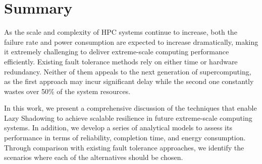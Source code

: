 \section{Summary}

As the scale and complexity of HPC systems continue to increase, both the failure rate and power consumption are expected to increase dramatically, making it extremely challenging to deliver extreme-scale computing performance efficiently. Existing fault tolerance methods rely on either time or hardware redundancy. Neither of them appeals to the next generation of supercomputing, as the first approach may incur significant delay while the second one constantly wastes over 50\% of the system resources.

In this work, we present a comprehensive discussion of the techniques that enable Lazy Shadowing to achieve scalable resilience in future extreme-scale computing systems. In addition, we develop a series of analytical models to assess its performance in terms of reliability, completion time, and energy consumption. 
Through comparison with existing fault tolerance approaches, we identify the scenarios where each of the alternatives should be chosen.










